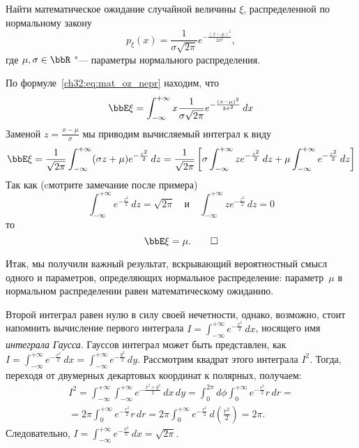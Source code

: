 \begin{exmpl}
Найти математическое ожидание случайной величины $\xi$, распределенной по нормальному закону
$$
p_{\xi}(x) = \frac{1}{\sigma \sqrt{2\pi}}e^{-\frac{(x-\mu)^2}{2\sigma^2}},
$$
где $\mu,\sigma\in\bbR$ "--- параметры нормального распределения. 
\end{exmpl}
\begin{solution}
По формуле~\eqref{ch32:eq:mat_oz_nepr} находим, что 
$$
\bbE\xi = \int_{-\infty}^{+\infty} x \frac{1}{\sigma \sqrt{2\pi}}e^{-\frac{(x-\mu)^2}{2\sigma^2}} \,dx 
$$
Заменой $z = \frac{x-\mu}{\sigma}$ мы приводим вычисляемый интеграл к виду
$$
\bbE\xi = \frac{1}{\sqrt{2\pi}} \int_{-\infty}^{+\infty} (\sigma z + \mu) e^{-\frac{z^2}{2}} \,dz = \frac{1}{\sqrt{2\pi}}\left[ \sigma\int_{-\infty}^{+\infty} z e^{-\frac{z^2}{2}} \,dz + \mu\int_{-\infty}^{+\infty} e^{-\frac{z^2}{2}} \,dz\right]
$$
Так как (cмотрите замечание после примера)
$$
\int_{-\infty}^{+\infty} e^{-\frac{z^2}{2}} \,dz = \sqrt{2\pi} \quad\text{и}\quad \int_{-\infty}^{+\infty} z e^{-\frac{z^2}{2}} \,dz = 0
$$
то 
\begin{equation*}
\bbE \xi = \mu.\qedhere
\end{equation*}
\end{solution}

Итак, мы получили важный результат, вскрывающий вероятностный смысл одного и параметров, определяющих нормальное распределение: параметр~$\mu$ в нормальном распределении равен математическому ожиданию.

\begin{notion}
Второй интеграл равен нулю в силу своей нечетности, однако, возможно, стоит напомнить вычисление первого интеграла $I= \int_{-\infty}^{+\infty} e^{-\frac{x^2}{2}} \,dx$, носящего имя \textit{интеграла Гаусса}.
Гауссов интеграл может быть представлен, как $I = \int_{-\infty}^{+\infty} e^{-\frac{x^2}{2}}\,dx = \int_{-\infty}^{+\infty} e^{-\frac{y^2}{2}}\,dy $. Рассмотрим квадрат этого интеграла $I^2$. Тогда, переходя от двумерных декартовых координат к полярных, получаем:
\begin{multline*}
I^2 = \int_{-\infty}^{+\infty} \int_{-\infty}^{+\infty} e^{-\frac{x^2+y^2}{2}}\,dx\,dy = \int_{0}^{2\pi}d\phi \int_{0}^{+\infty} e^{-\frac{r^2}{2}} r\,dr =\\
= 2\pi \int_{0}^{+\infty} e^{-\frac{r^2}{2}} r\,dr 
= 2\pi \int_{0}^{+\infty} e^{-\frac{r^2}{2}}\,d({\scriptstyle \frac{r^2}{2}}) = 2\pi.
\end{multline*}
Следовательно, $I = \int_{-\infty}^{+\infty} e^{-\frac{x^2}{2}}\,dx = \sqrt{2\pi}$.
\end{notion}

